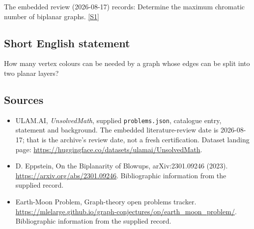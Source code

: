 \documentclass[11pt,a4paper]{article}
\newcommand{\sref}[2]{\hyperlink{source:#1:#2}{[S#2]}}
\begin{document}
The embedded review (2026-08-17) records: Determine the maximum chromatic number of biplanar graphs. \sref{statement}{1}

\subsection{Short English statement}

How many vertex colours can be needed by a graph whose edges can be split into two planar layers?

\subsection{Sources}

{\small

\begin{itemize}

\item[\hypertarget{source:statement:1}{S1}] ULAM.AI, \emph{UnsolvedMath}, supplied \texttt{problems.json}, catalogue entry, statement and background. The embedded literature-review date is 2026-08-17; that is the archive’s review date, not a fresh certification. Dataset landing page: \url{https://huggingface.co/datasets/ulamai/UnsolvedMath}.

\item[\hypertarget{source:statement:2}{S2}] D. Eppstein, On the Biplanarity of Blowups, arXiv:2301.09246 (2023). \url{https://arxiv.org/abs/2301.09246}. Bibliographic information from the supplied record.

\item[\hypertarget{source:statement:3}{S3}] Earth-Moon Problem, Graph-theory open problems tracker. \url{https://mlelarge.github.io/graph-conjectures/op/earth_moon_problem/}. Bibliographic information from the supplied record.

\end{itemize}

}

\label{end:statement}
\end{document}
